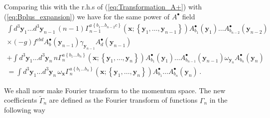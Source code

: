\documentclass[english,american]{article}
\begin{document}
Comparing this with the r.h.s of (\ref{eq:Transformation_A+}) with (\ref{eq:Bplus_expansion})
we have for the same power of $A^{\bullet}$ field
\begin{multline}
\int d^{3}\mathbf{y}_{1}\dots d^{3}\mathbf{y}_{n-1}\,\left(n-1\right)\Gamma_{n-1}^{a\left\{ b_{1}\dots b_{n-2}c\right\} }\left(\mathbf{x};\left\{ \mathbf{y}_{1},\dots,\mathbf{y}_{n-1}\right\} \right)A_{b_{1}}^{\bullet}\left(\mathbf{y}_{1}\right)\dots A_{b_{n-2}}^{\bullet}\left(\mathbf{y}_{n-2}\right)\\
\times\left(-g\right)f^{cbd}A_{b}^{\bullet}\left(\mathbf{y}_{n-1}\right)\gamma_{\mathbf{y}_{n-1}}A_{d}^{\bullet}\left(\mathbf{y}_{n-1}\right)\\
+\int d^{3}\mathbf{y}_{1}\dots d^{3}\mathbf{y}_{n}\, n\Gamma_{n}^{a\left\{ b_{1}\dots b_{n}\right\} }\left(\mathbf{x};\left\{ \mathbf{y}_{1},\dots,\mathbf{y}_{n}\right\} \right)A_{b_{1}}^{\bullet}\left(\mathbf{y}_{1}\right)\dots A_{b_{n-1}}^{\bullet}\left(\mathbf{y}_{n-1}\right)\omega_{\mathbf{y}_{n}}A_{b_{n}}^{\bullet}\left(\mathbf{y}_{n}\right)\\
=\int d^{3}\mathbf{y}_{1}\dots d^{3}\mathbf{y}_{n}\,\omega_{\mathbf{x}}\Gamma_{n}^{a\left\{ b_{1}\dots b_{n}\right\} }\left(\mathbf{x};\left\{ \mathbf{y}_{1},\dots,\mathbf{y}_{n}\right\} \right)A_{b_{1}}^{\bullet}\dots A_{b_{n}}^{\bullet}\left(\mathbf{y}_{n}\right)\,.\label{eq:MasterEq_pos}
\end{multline}


We shall now make Fourier transform to the momentum space. The new coefficients $\tilde{\Gamma}_n$ are defined as the Fourier transform of functions $\Gamma_n$ in the following way
\end{document}
